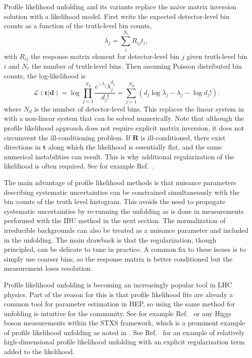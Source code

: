 Profile likelihood unfolding and its variants replace the naive matrix inversion solution with a likelihood model.
First write the expected detector-level bin counts as a function of the truth-level bin counts,
\begin{equation}
    \lambda_j = \sum_i^{N_t} R_{ij} t_i ,
    \label{eq:unfolding_expected_yield}
\end{equation}
with $R_{ij}$ the response matrix element for detector-level bin $j$ given truth-level bin $i$ and $N_t$ the number of truth-level bins.
Then assuming Poisson distributed bin counts, the log-likelihood is
\begin{equation}
    \mathcal{L}(\textbf{t} | \textbf{d}) = \log \prod_{j=1}^{N_d} \frac{e^{-\lambda_j}\lambda_j^{d_j}}{d_j!} = \sum_{j=1}^{N_d} \left( d_j \log \lambda_j - \lambda_j - \log d_j! \right) .
    \label{eq:unfolding_poisson_likelihood}
\end{equation}
where $N_d$ is the number of detector-level bins.
This replaces the linear system in  with a non-linear system that can be solved numerically.
Note that although the profile likelihood approach does not require explicit matrix inversion, it does not circumvent the ill-conditioning problem.
If $\mathbf{R}$ is ill-conditioned, there exist directions in $\mathbf{t}$ along which the likelihood is essentially flat, and the same numerical instabilities can result.
This is why additional regularization of the likelihood is often required.
See for example Ref.~\cite{Tikhonov:1963}.

The main advantage of profile likelihood methods is that nuisance parameters describing systematic uncertainties can be constrained simultaneously with the bin counts of the truth level histogram.
This avoids the need to propagate systematic uncertainties by re-running the unfolding as is done in measurements performed with the IBU method in the next section.
The normalization of irreducible backgrounds can also be treated as a nuisance parameter and included in the unfolding.
The main drawback is that the regularization, though principled, can be delicate to tune in practice.
A common fix to these issues is to simply use coarser bins, so the response matrix is better conditioned but the measurement loses resolution.

Profile likelihood unfolding is becoming an increasingly popular tool in LHC physics.
Part of the reason for this is that profile likelihood fits are already a common tool for parameter estimation in HEP, so using the same method for unfolding is intuitive for the community.
See for example Ref.~\cite{CMS:2024mke} or any Higgs boson measurements within the STXS framework, which is a prominent example of profile likelihood unfolding as noted in .
See Ref.~\cite{Collaboration:2944725} for an example of relatively high-dimensional profile likelihood unfolding with an explicit regularization term added to the likelihood.


